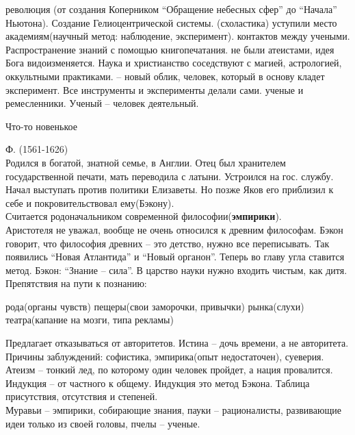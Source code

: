 \documentclass[a4paper,12pt]{report} %
\begin{document}
\begin{enumerate}
 революция (от создания Коперником ``Обращение небесных сфер''
  до ``Начала'' Ньютона). Создание Гелиоцентрической системы.
(схоластика) уступили место академиям(научный метод:
  наблюдение, эксперимент).
 контактов между учеными. Распространение знаний с
  помощью книгопечатания.
 не были атеистами, идея Бога видоизменяется. Наука и
  христианство соседствуют с магией, астрологией, оккультными
  практиками.
 -- новый облик, человек, который в основу кладет
  эксперимент. Все инструменты и эксперименты делали сами.
 ученые и ремесленники. Ученый -- человек деятельный.
\end{enumerate}
Что-то новенькое
\begin{itemize}
 Ф. (1561-1626)\\
  Родился в богатой, знатной семье, в Англии. Отец был хранителем государственной
  печати, мать переводила с латыни. Устроился на гос. службу. Начал
  выступать против политики Елизаветы. Но позже Яков его приблизил к
  себе и покровительствовал ему(Бэкону).\\
  Считается родоначальником современной философии(\textbf{эмпирики}).\\
  Аристотеля не уважал, вообще не очень относился к древним
  философам. Бэкон говорит, что философия древних -- это детство, нужно
  все переписывать. Так появились ``Новая Атлантида'' и ``Новый
  органон''. Теперь во главу угла ставится метод. Бэкон: ``Знание --
  сила''. В царство науки нужно входить чистым, как дитя.\\
  Препятствия на пути к познанию:
  \begin{enumerate}
   рода(органы чувств)
   пещеры(свои заморочки, привычки)
   рынка(слухи)
   театра(капание на мозги, типа рекламы)
  \end{enumerate}
  Предлагает отказываться от авторитетов. Истина -- дочь времени, а не
  авторитета. Причины заблуждений: софистика, эмпирика(опыт
  недостаточен), суеверия.\\
  Атеизм -- тонкий лед, по которому один человек пройдет, а нация
  провалится.\\
  Индукция -- от частного к общему. Индукция это метод Бэкона. Таблица
  присутствия, отсутствия и степеней.\\
  Муравьи -- эмпирики, собирающие знания, пауки -- рационалисты,
  развивающие идеи только из своей головы, пчелы -- ученые.\\

\end{itemize}
\end{document}
